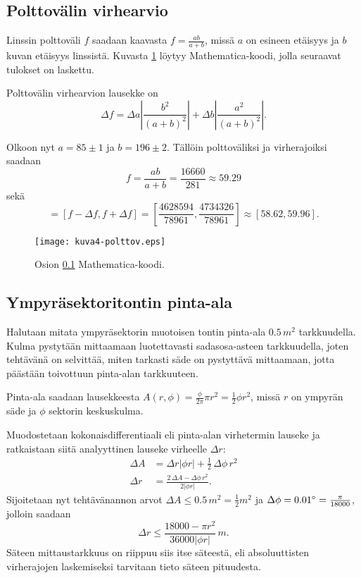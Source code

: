 \documentclass[a4paper,11pt]{article}
\begin{document}
{\subsection{Polttovälin virhearvio}
\label{polttovali}

Linssin polttoväli $f$ saadaan kaavasta $f=\frac{ab}{a+b}$, missä $a$ on esineen etäisyys ja $b$ kuvan etäisyys linssistä. Kuvasta \ref{fig:polttov} löytyy Mathematica-koodi, jolla seuraavat tulokset on laskettu.

Polttovälin virhearvion lausekke on
\begin{equation}
    \Delta f = \Delta a \left\lvert \frac{b^2}{(a+b)^2} \right\rvert + \Delta b \left\lvert \frac{a^2}{(a+b)^2} \right\rvert.
\end{equation}

Olkoon nyt $a=85\pm1$ ja $b=196\pm2$. Tällöin polttoväliksi ja virherajoiksi saadaan
\begin{equation}
    f = \frac{ab}{a+b} = \frac{16660}{281} \approx 59.29
\end{equation}
sekä
\begin{equation}
    [f_{min},f_{max}] = [f-\Delta f, f+\Delta f] = \left[\frac{4628594}{78961}, \frac{4734326}{78961}\right] \approx [58.62, 59.96].
\end{equation}

\begin{figure}
    \centering
    \texttt{[image: kuva4-polttov.eps]}
    \caption{Osion \ref{polttovali} Mathematica-koodi.}
    \label{fig:polttov}
\end{figure}

\subsection{Ympyräsektoritontin pinta-ala}
\label{sektoritontti}

Halutaan mitata ympyräsektorin muotoisen tontin pinta-ala $0.5\,m^2$ tarkkuudella. Kulma pystytään mittaamaan luotettavasti sadasosa-asteen tarkkuudella, joten tehtävänä on selvittää, miten tarkasti säde on pystyttävä mittaamaan, jotta päästään toivottuun pinta-alan tarkkuuteen.

Pinta-ala saadaan lausekkeesta $A(r,\phi)=\frac{\phi}{2\pi}\pi r^2=\frac{1}{2}\phi r^2$, missä $r$ on ympyrän säde ja $\phi$ sektorin keskuskulma.

Muodostetaan kokonaisdifferentiaali eli pinta-alan virhetermin lauseke ja ratkaistaan siitä analyyttinen lauseke virheelle $\Delta r$:
\begin{align}
    \Delta A & = \Delta r \lvert\phi r\rvert + \frac{1}{2}\, \Delta \phi\, r^2\\
    \Delta r & = \frac{2\,\Delta A-\Delta\phi\, r^2}{2\lvert\phi r\rvert}.
\end{align}
Sijoitetaan nyt tehtävänannon arvot $\Delta A \leq 0.5\,m^2 = \frac{1}{2}m^2$ ja $\Delta\phi = 0.01\degree = \frac{\pi}{18000}$, jolloin saadaan
\begin{equation}
    \Delta r \leq \frac{18000-\pi r^2}{36000 \lvert \phi r \rvert}\,m.
\end{equation}
Säteen mittaustarkkuus on riippuu siis itse säteestä, eli absoluuttisten virherajojen laskemiseksi tarvitaan tieto säteen pituudesta.

}
\end{document}
